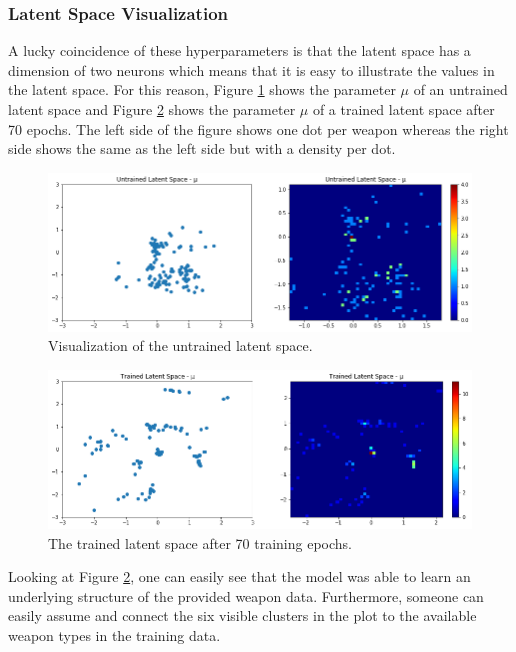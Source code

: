 \documentclass[MGS,Master,english]{twbook}%
\begin{document}
\subsubsection{Latent Space Visualization}
A lucky coincidence of these hyperparameters is that the latent space has a dimension of two neurons which means that it is easy to illustrate the values in the latent space. For this reason, Figure \ref{fig::vae::untrainedLatentSpace} shows the parameter $\mu$ of an untrained latent space and Figure \ref{fig::vae::trainedLatentSpace} shows the parameter $\mu$ of a trained latent space after 70 epochs. The left side of the figure shows one dot per weapon whereas the right side shows the same as the left side but with a density per dot.
\begin{figure}[!ht]
	\centering
	\includegraphics[width=1.0\linewidth]{PICs/trained_vae/untrained_latent_space}
	\caption{Visualization of the untrained latent space.} \label{fig::vae::untrainedLatentSpace}
\end{figure}
\begin{figure}[!ht]
	\centering
	\includegraphics[width=1.0\linewidth]{PICs/trained_vae/trained_latent_space}
	\caption{The trained latent space after 70 training epochs.} \label{fig::vae::trainedLatentSpace}
\end{figure}

Looking at Figure \ref{fig::vae::trainedLatentSpace}, one can easily see that the model was able to learn an underlying structure of the provided weapon data. Furthermore, someone can easily assume and connect the six visible clusters in the plot to the available weapon types in the training data.
\end{document}
